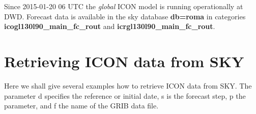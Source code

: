 \begin{note}
Since 2015-01-20 06 UTC the \emph{global} ICON model is running operationally at DWD.
Forecast data is available in the sky database \textbf{db=roma} in categories
\textbf{icogl130l90\_main\_fc\_rout} and \textbf{icrgl130l90\_main\_fc\_rout}.
\end{note}

\section{Retrieving ICON data from SKY}\label{sec_example}

Here we shall give several examples how to retrieve ICON data from SKY.
The parameter d specifies the reference or initial date, s is the forecast step, p the parameter,
and f the name of the GRIB data file.

